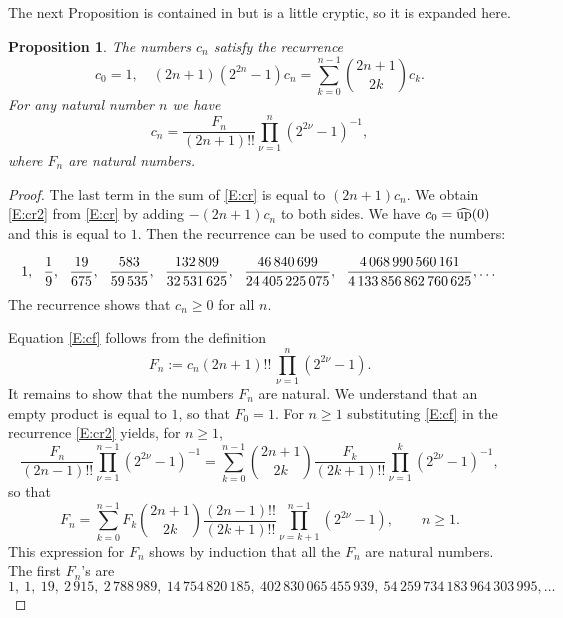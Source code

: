\documentclass[10pt]{amsart}
\newtheorem{prop}[thm]{Proposition}
\theoremstyle{definition}
\theoremstyle{remark}
\def\nn{\mskip12mu}
\begin{document}
The next Proposition is contained in \cite{MR666839} but is a little
cryptic, so it is  expanded here.
\begin{prop}\label{PD:F}
The numbers $c_n$ satisfy the recurrence
\begin{equation}\label{E:cr2}
c_0=1,\quad (2n+1)(2^{2n}-1)c_n=\sum_{k=0}^{n-1}\binom{2n+1}{2k}c_k.
\end{equation}
For any natural number $n$ we have
\begin{equation}\label{E:cf}
c_n=\frac{F_n}{(2n+1)!!}\prod_{\nu=1}^n(2^{2\nu}-1)^{-1},
\end{equation}
where $F_n$ are natural numbers.
\end{prop}

\begin{proof}
The last term in the sum of \eqref{E:cr} is equal to $(2n+1)c_n$. We obtain
\eqref{E:cr2} from \eqref{E:cr} by adding $-(2n+1)c_n$ to both sides.
We have $c_0=\widehat{\operatorname{up}}(0)$ and this is equal to $1$.  Then the recurrence
can be used to compute the numbers:

\[1,\nn\frac{1}{9},\nn\frac{19}{675},\nn\frac{583}{59\,535},
\nn\frac{132\,809}{32\,531\,625},
\nn\frac{46\,840\,699}{24\,405\,225\,075},\nn\frac{4\,068\,990\,560\,161}{4\,133\,856\,862\,760\,625},\dots\]
The recurrence shows that $c_n\ge0$ for all $n$.

Equation \eqref{E:cf} follows from the definition
\begin{equation}\label{E:Fnum_def}
F_n:= c_n(2n+1)!!\,\prod_{\nu=1}^n (2^{2\nu}-1).
\end{equation}
It remains to show that the numbers $F_n$ are natural.
We understand that an empty product is equal to $1$, so that $F_0=1$. For
$n\ge1$  substituting \eqref{E:cf} in the recurrence \eqref{E:cr2} yields, for $n\ge1$,
\[\frac{F_n}{(2n-1)!!}\prod_{\nu=1}^{n-1}(2^{2\nu}-1)^{-1}=
\sum_{k=0}^{n-1}\binom{2n+1}{2k}\frac{F_k}{(2k+1)!!}\prod_{\nu=1}^{k}(2^{2\nu}-1)^{-1},
\]
so that
\begin{equation}\label{Rec:F}
F_n=\sum_{k=0}^{n-1}F_k\binom{2n+1}{2k}\frac{(2n-1)!!}{(2k+1)!!}
\prod_{\nu=k+1}^{n-1}(2^{2\nu}-1),\qquad n\ge1.
\end{equation}
This expression for $F_n$ shows by induction  that all the $F_n$ are natural numbers.
The first $F_n$'s are
\[1,\ 1,\  19,\  2\,915,\  2\,788\,989,\  14\,754\,820\,185,\  402\,830\,065\,455\,939, \
54\,259\,734\,183\,964\,303\,995,\dots\]
\end{proof}
\end{document}
